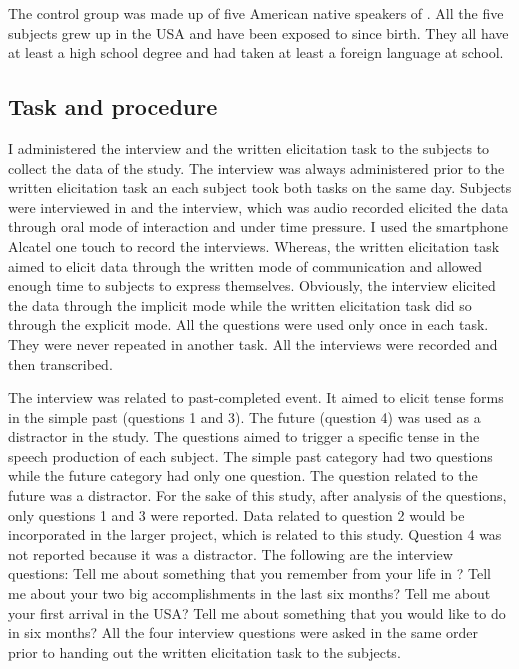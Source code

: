 \documentclass[output=paper,
modfonts
]{langscibook}
\begin{document}
The control group was made up of five American native speakers of . All the five subjects grew up in the USA and have been exposed to  since birth. They all have at least a high school degree and had taken at least a foreign language at school.

\subsection{Task and procedure}

I administered the interview and the written elicitation task to the subjects to collect the data of the study. The interview was always administered prior to the written elicitation task an each subject took both tasks on the same day. Subjects were interviewed in  and the interview, which was audio recorded elicited the data through oral mode of interaction and under time pressure. I used the smartphone Alcatel one touch to record the interviews. Whereas, the written elicitation task aimed to elicit data through the written mode of communication and allowed enough time to subjects to express themselves. Obviously, the interview elicited the data through the implicit mode while the written elicitation task did so through the explicit mode. All the questions were used only once in each task. They were never repeated in another task. All the interviews were recorded and then transcribed. 

The interview was related to past-completed event. It aimed to elicit  tense forms in the simple past (questions 1 and 3). The future (question 4) was used as a distractor in the study. The questions aimed to trigger a specific  tense in the speech production of each subject. The simple past category had two questions while the future category had only one question. The question related to the future was a distractor. For the sake of this study, after analysis of the questions, only questions 1 and 3 were reported. Data related to question 2 would be incorporated in the larger project, which is related to this study. Question 4 was not reported because it was a distractor. The following are the interview questions: Tell me about something that you remember from your life in ? Tell me about your two big accomplishments in the last six months? Tell me about your first arrival in the USA? Tell me about something that you would like to do in six months? All the four interview questions were asked in the same order prior to handing out the written elicitation task to the subjects. 
\end{document}
